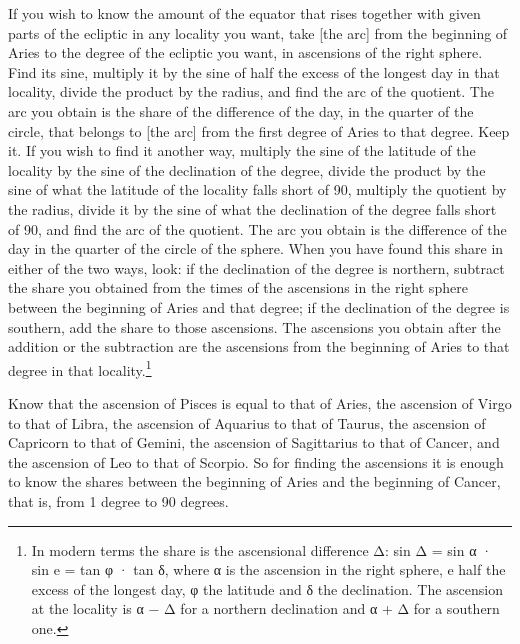 \documentclass[11pt]{article}
\newcommand{\ArPage}[1]{\marginpar{\footnotesize\color{gray}Ar.\,p.\,#1}}
\begin{document}
\par \ArPage{40}If you wish to know the amount of the equator that rises together with given parts of the ecliptic in any locality you want, take [the arc] from the beginning of Aries to the degree of the ecliptic you want, in ascensions of the right sphere. Find its sine, multiply it by the sine of half the excess of the longest day in that locality, divide the product by the radius, and find the arc of the quotient. The arc you obtain is the share of the difference of the day, in the quarter of the circle, that belongs to [the arc] from the first degree of Aries to that degree. Keep it. If you wish to find it another way, multiply the sine of the latitude of the locality by the sine of the declination of the degree, divide the product by the sine of what the latitude of the locality falls short of 90, multiply the quotient by the radius, divide it by the sine of what the declination of the degree falls short of 90, and find the arc of the quotient. The arc you obtain is the difference of the day in the quarter of the circle of the sphere. When you have found this share in either of the two ways, look: if the declination of the degree is northern, subtract the share you obtained from the times of the ascensions in the right sphere between the beginning of Aries and that degree; if the declination of the degree is southern, add the share to those ascensions. The ascensions you obtain after the addition or the subtraction are the ascensions from the beginning of Aries to that degree in that locality.\footnote{In modern terms the share is the ascensional difference Δ: sin Δ = sin α · sin e = tan φ · tan δ, where α is the ascension in the right sphere, e half the excess of the longest day, φ the latitude and δ the declination. The ascension at the locality is α − Δ for a northern declination and α + Δ for a southern one.}\par
\par Know that the ascension of Pisces is equal to that of Aries, the ascension of Virgo to that of Libra, the ascension of Aquarius to that of Taurus, the ascension of Capricorn to that of Gemini, the ascension of Sagittarius to that of Cancer, and the ascension of Leo to that of Scorpio. So for finding the ascensions it is enough to know the shares between the beginning of Aries and the beginning of Cancer, that is, from 1 degree to 90 degrees.\par
\end{document}
